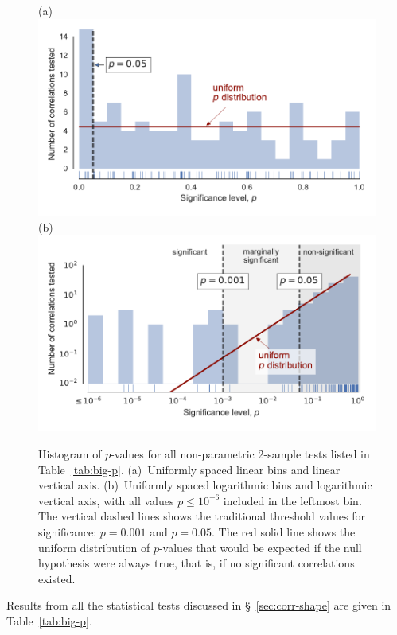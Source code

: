 \begin{figure}
  (a)\\
  \includegraphics[width=\linewidth]{figs/p-value-histogram-new-linear}\\
  (b)\\
  \includegraphics[width=\linewidth]{figs/p-value-histogram-new}
  \caption{Histogram of \(p\)-values for all non-parametric 2-sample
    tests listed in Table~\ref{tab:big-p}. (a)~Uniformly spaced linear
    bins and linear vertical axis. (b)~Uniformly spaced logarithmic
    bins and logarithmic vertical axis, with all values
    \(p \le 10^{-6}\) included in the leftmost bin.  The vertical dashed
    lines shows the traditional threshold values for significance:
    \(p = 0.001\) and \(p = 0.05\). The red solid line shows the
    uniform distribution of \(p\)-values that would be expected if the
    null hypothesis were always true, that is, if no significant
    correlations existed.}
  \label{fig:histo-p-values}
\end{figure}


Results from all the statistical tests discussed in \S~\ref{sec:corr-shape} are given in Table~\ref{tab:big-p}.  


